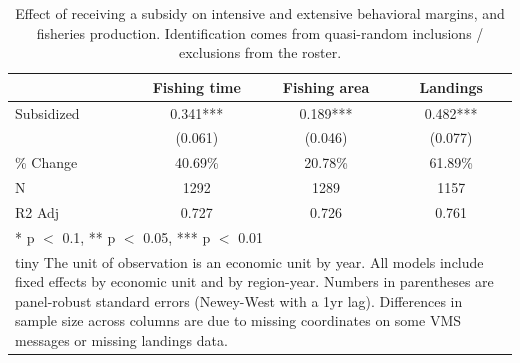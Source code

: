\begin{table}
\centering
\caption{\label{tab:semi_elasticity}Effect of receiving a subsidy on intensive and extensive behavioral margins, and fisheries production. Identification comes from quasi-random inclusions / exclusions from the roster.}
\centering
\begin{tabular}[t]{lccc}
\toprule
  & Fishing time & Fishing area & Landings\\
\midrule
Subsidized & \num{0.341}*** & \num{0.189}*** & \num{0.482}***\\
 & (\num{0.061}) & (\num{0.046}) & (\num{0.077})\\
\midrule
\% Change & 40.69\% & 20.78\% & 61.89\%\\
N & \num{1292} & \num{1289} & \num{1157}\\
R2 Adj & \num{0.727} & \num{0.726} & \num{0.761}\\
\bottomrule
\multicolumn{4}{l}{\rule{0pt}{1em}* p $<$ 0.1, ** p $<$ 0.05, *** p $<$ 0.01}\\
\multicolumn{4}{l}{\rule{0pt}{1em}tiny The unit of observation is an economic unit by year. All models include fixed effects by economic unit and by region-year. Numbers in parentheses are panel-robust standard errors (Newey-West with a 1yr lag). Differences in sample size across columns are due to missing coordinates on some VMS messages or missing landings data.}\\
\end{tabular}
\end{table}
